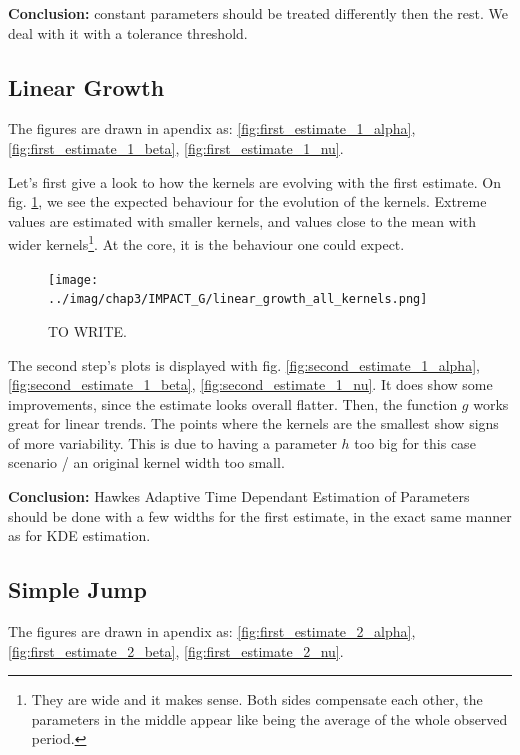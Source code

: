 \documentclass[11pt]{book}
\begin{document}
\textbf{Conclusion:} constant parameters should be treated differently then the rest. We deal with it with a tolerance threshold.




\subsection{Linear Growth}
The figures are drawn in apendix as: \ref{fig:first_estimate_1_alpha}, \ref{fig:first_estimate_1_beta}, \ref{fig:first_estimate_1_nu}.

Let's first give a look to how the kernels are evolving with the first estimate. On fig. \ref{fig:impact_g_linear}, we see the expected behaviour for the evolution of the kernels. Extreme values are estimated with smaller kernels, and values close to the mean with wider kernels\footnote{They are wide and it makes sense. Both sides compensate each other, the parameters in the middle appear like being the average of the whole observed period.}. At the core, it is the behaviour one could expect.

\begin{figure}
\centering
\texttt{[image: ../imag/chap3/IMPACT\_G/linear\_growth\_all\_kernels.png]}
\caption{TO WRITE.}
\label{fig:impact_g_linear}
\end{figure}


The second step's plots is displayed with fig. \ref{fig:second_estimate_1_alpha}, \ref{fig:second_estimate_1_beta}, \ref{fig:second_estimate_1_nu}. It does show some improvements, since the estimate looks overall flatter. Then, the function $g$ works great for linear trends. The points where the kernels are the smallest show signs of more variability. This is due to having a parameter $h$ too big for this case scenario / an original kernel width too small.


\textbf{Conclusion:} Hawkes Adaptive Time Dependant Estimation of Parameters should be done with a few widths for the first estimate, in the exact same manner as for KDE estimation. 




\subsection{Simple Jump}

The figures are drawn in apendix as: \ref{fig:first_estimate_2_alpha}, \ref{fig:first_estimate_2_beta}, \ref{fig:first_estimate_2_nu}.
\end{document}

